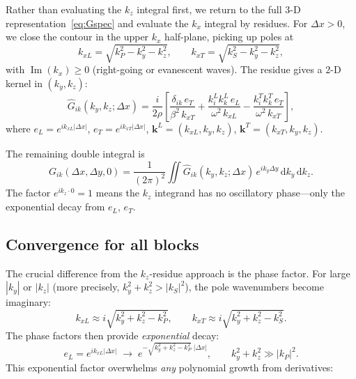 \documentclass[11pt,a4paper]{article}
\newcommand{\dd}{\mathrm{d}}
\newcommand{\im}{\operatorname{Im}}
\newcommand{\bk}{\mathbf{k}}
\begin{document}
Rather than evaluating the $k_z$ integral first, we return
to the full 3-D representation~\eqref{eq:Gspec} and evaluate the
$k_x$ integral by residues.
For $\Delta x > 0$, we close the contour in the upper
$k_x$ half-plane, picking up poles at
\begin{equation}\label{eq:kx_poles}
  k_{xL} = \sqrt{k_P^2 - k_y^2 - k_z^2}, \qquad
  k_{xT} = \sqrt{k_S^2 - k_y^2 - k_z^2},
\end{equation}
with $\im(k_x) \ge 0$ (right-going or evanescent waves).
The residue gives a 2-D kernel in $(k_y, k_z)$:
\begin{equation}\label{eq:kx_kernel}
  \hat{G}_{ik}(k_y,k_z;\Delta x)
  = \frac{i}{2\rho}\left[
    \frac{\delta_{ik}\,e_T}{\beta^2\,k_{xT}}
    + \frac{k^L_i k^L_k\,e_L}{\omega^2\,k_{xL}}
    - \frac{k^T_i k^T_k\,e_T}{\omega^2\,k_{xT}}
  \right],
\end{equation}
where $e_L = e^{ik_{xL}|\Delta x|}$,
$e_T = e^{ik_{xT}|\Delta x|}$,
$\bk^L = (k_{xL}, k_y, k_z)$,
$\bk^T = (k_{xT}, k_y, k_z)$.

The remaining double integral is
\begin{equation}\label{eq:kx_double}
  G_{ik}(\Delta x, \Delta y, 0)
  = \frac{1}{(2\pi)^2}\iint
    \hat{G}_{ik}(k_y, k_z;\Delta x)\,
    e^{ik_y\Delta y}\,
    \dd k_y\,\dd k_z.
\end{equation}
The factor $e^{ik_z\cdot 0}=1$ means the $k_z$ integrand has
no oscillatory phase---only the exponential decay from
$e_L$, $e_T$.

\subsection{Convergence for all blocks}\label{sec:kx_convergence}

The crucial difference from the $k_z$-residue approach is
the phase factor.  For large $|k_y|$ or $|k_z|$
(more precisely, $k_y^2 + k_z^2 > |k_S|^2$),
the pole wavenumbers become imaginary:
\[
  k_{xL} \approx i\sqrt{k_y^2 + k_z^2 - k_P^2}, \qquad
  k_{xT} \approx i\sqrt{k_y^2 + k_z^2 - k_S^2}.
\]
The phase factors then provide \emph{exponential} decay:
\begin{equation}\label{eq:exp_decay}
  e_L = e^{ik_{xL}|\Delta x|}
  \;\longrightarrow\;
  e^{-\sqrt{k_y^2+k_z^2-k_P^2}\;|\Delta x|},
  \qquad
  k_y^2+k_z^2 \gg |k_P|^2.
\end{equation}
This exponential factor overwhelms \emph{any} polynomial
growth from derivatives:
\end{document}
